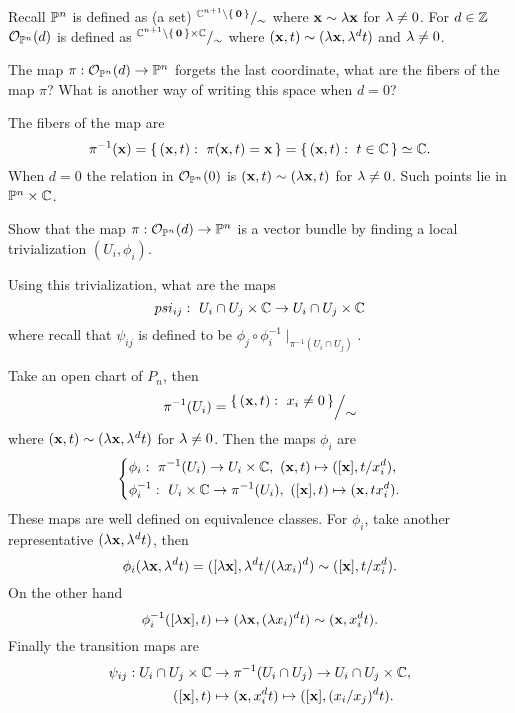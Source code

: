 \documentclass[12pt]{memoir}
\begin{document}
\begin{Ej}
    Recall $\mathbb{P}^n$ is defined as (a set) $\quot{\bC^{n+1}\less\set{\vec{0}}}{\sim}$ where $\mathbf{x}\sim\lambda\mathbf{x}$ for $\lambda\neq 0$. For $d\in\mathbb{Z}$ $\mathcal{O}_{\mathbb{P}^n}(d)$ is defined as $\quot{\bC^{n+1}\less\set{\vec{0}}\x\bC}{\sim}$ where $(\mathbf{x},t)\sim(\lambda\mathbf{x},\lambda^d t)$ and $\lambda\neq 0$.\par 
    The map $\pi:\mathcal{O}_{\mathbb{P}^n}(d)\to\mathbb{P}^n$ forgets the last coordinate, what are the fibers of the map $\pi$? What is another way of writing this space when $d=0$?
 \end{Ej}
 
 \begin{ptcbr}
    The fibers of the map are 
    $$\pi^{-1}(\vec{x})=\set{(\vec{x},t):\ \pi(\vec{x},t)=\vec{x}}=\set{(\vec{x},t):\ t\in\bC}\isom\bC.$$
    When $d=0$ the relation in $\mathcal{O}_{\mathbb{P}^n}(0)$ is $(\mathbf{x},t)\sim(\lambda\mathbf{x},t)$ for $\lambda\neq 0$. Such points lie in $\mathbb{P}^n\times\mathbb{C}$.
 \end{ptcbr}

 \begin{Ej}
    Show that the map $\pi:\mathcal{O}_{\mathbb{P}^n}(d)\to\mathbb{P}^n$ is a vector bundle by finding a local trivialization $(U_i,\phi_i)$.\par 
    Using this trivialization, what are the maps
$$psi_{ij}:\ U_i \cap U_j \times \mathbb{C} \to U_i \cap U_j \times \mathbb{C}$$
where recall that $\psi_{ij}$ is defined to be $\phi_j\circ\phi_i^{-1}\mid_{\pi^{-1}(U_i\cap U_j)}$.
 \end{Ej}
 
 \begin{ptcbr}
    Take an open chart of $P_n$, then 
    $$\pi^{-1}(U_i)=\quot{\set{(\vec{x},t):\ x_i\neq 0}}{\sim}$$
    where $(\mathbf{x},t)\sim(\lambda \mathbf{x},\lambda^d t)$ for $\lambda\neq 0$. Then the maps $\phi_i$ are 
    $$
    \left\lbrace
    \begin{aligned}
        &\phi_i:\ \pi^{-1}(U_i)\to U_i\x\bC,\ (\vec{x},t)\mapsto ([\vec{x}],t/x_i^d),\\
        &\phi_i^{-1}:\  U_i\x\bC\to\pi^{-1}(U_i),\ ([\vec{x}],t)\mapsto (\vec{x},tx_i^d).
    \end{aligned}
    \right.
    $$
    These maps are well defined on equivalence classes. For $\phi_i$, take another representative $(\lambda\mathbf{x},\lambda^d t)$, then 
    $$\phi_i(\lambda\mathbf{x},\lambda^d t)=([\lambda\mathbf{x}],\lambda^d t/(\lambda x_i)^d)\sim([\mathbf{x}],t/x_i^d).$$
    On the other hand 
    $$\phi_i^{-1}([\lambda\mathbf{x}],t)\mapsto(\lambda\mathbf{x},(\lambda x_i)^dt)\sim(\mathbf{x},x_i^dt).$$
    Finally the transition maps are 
    \begin{align*}
        \psi_{ij}:U_i \cap U_j \times \mathbb{C}&\to\pi^{-1}(U_i\cap U_j)\to U_i \cap U_j \times \mathbb{C},\\
        ([\mathbf{x}],t)&\mapsto(\mathbf{x},x_i^dt)\mapsto([\mathbf{x}],(x_i/x_j)^dt).
    \end{align*}
 \end{ptcbr}
 
\end{document}

